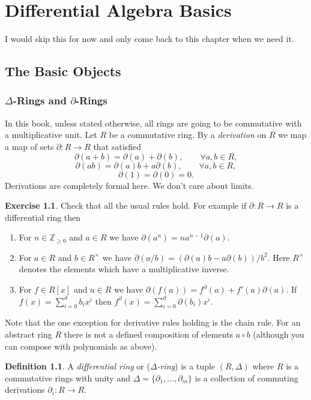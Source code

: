 \documentclass[12pt]{book}
\numberwithin{equation}{section}
\theoremstyle{definition}
\newtheorem{definition}[theorem]{Definition}
\newtheorem{exercise}[theorem]{Exercise}
\theoremstyle{remark}
\newcommand{\ZZ}{\mathbb{Z}}
\begin{document}
\chapter{Differential Algebra Basics}
I would skip this for now and only come back to this chapter when we need it. 

\section{The Basic Objects}

\subsection{$\Delta$-Rings and $\partial$-Rings}
In this book, unless stated otherwise, all rings are going to be commutative with a multiplicative unit. 
Let $R$ be a commutative ring. 
By a \emph{derivation} on $R$ we map a map of sets $\partial:R\to R$ that satisfied 
 $$ \partial(a+b) = \partial(a) + \partial(b), \qquad \forall a,b\in R,$$
 $$ \partial(ab) = \partial(a) b + a\partial(b), \qquad \forall a, b \in R, $$
 $$ \partial(1) = \partial(0) = 0.$$
Derivations are completely formal here. 
We don't care about limits. 

\begin{exercise}
	Check that all the usual rules hold. For example if $\partial:R \to R$ is a differential ring then 
	\begin{enumerate}
		\item For $n\in \ZZ_{\geq 0}$ and $a \in R$ we have $\partial(a^n) = na^{n-1}\partial(a)$.
		\item For $a \in R$ and $b\in R^{\times}$ we have $\partial(a/b) = (\partial(a)b - a \partial(b))/b^2$. Here $R^{\times}$ denotes the elements which have a multiplicative inverse.
		\item For $f \in R[x]$ and $a \in R$ we have $\partial(f(a)) = f^{\partial}(a) + f'(a)\partial(a)$. If $f(x) = \sum_{i=0}^d b_i x^i$ then $f^{\partial}(x) = \sum_{i=0}^d \partial(b_i) x^i$. 
	\end{enumerate}
\end{exercise}
Note that the one exception for derivative rules holding is the chain rule. 
For an abstract ring $R$ there is not a defined composition of elements $a\circ b$ (although you can compose with polynomials as above).


\begin{definition}
	A \emph{differential ring} or (\emph{$\Delta$-ring}) is a tuple $(R,\Delta)$ where $R$ is a commutative rings with unity and $\Delta = \lbrace \partial_1,\ldots,\partial_m\rbrace$ is a collection of commuting derivations $\partial_i:R \to R$. 
\end{definition}
\end{document}

